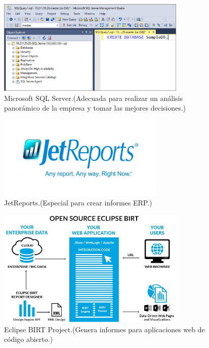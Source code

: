 \documentclass[a4paper,12pt,twocolumn]{article}
\begin{document}
\begin{figure}[h!]
\centering
\includegraphics[width=9cm]{./Imagenes/BIimagen8}
\caption{\label{fig:01}Microsoft SQL Server.(Adecuada para realizar un análisis panorámico de la empresa y tomar las mejores decisiones.)}
\end{figure}

\begin{figure}[h!]
\centering
\includegraphics[width=8cm]{./Imagenes/BIimagen9}
\caption{\label{fig:01}JetReports.(Especial para crear informes ERP.)}
\end{figure}

\begin{figure}[h!]
\centering
\includegraphics[width=9cm]{./Imagenes/BIimagen10}
\caption{\label{fig:01}Eclipse BIRT Project.(Genera informes para aplicaciones web de código abierto.)}
\end{figure}
\textbf{}\\
\textbf{}\\
\end{document}
